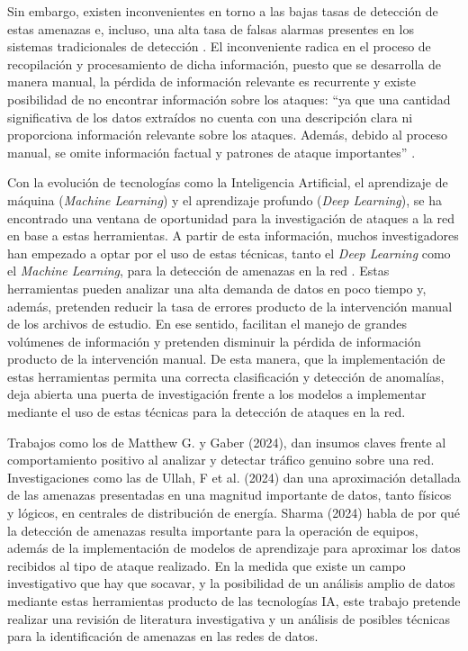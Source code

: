 \documentclass[12pt,a4paper]{article}
\begin{document}
Sin embargo, existen inconvenientes en torno a las bajas tasas de detección de estas amenazas e, incluso, una alta tasa de falsas alarmas presentes en los sistemas tradicionales de detección \cite[pág.~1]{alhawawreh2024explainable}. El inconveniente radica en el proceso de recopilación y procesamiento de dicha información, puesto que se desarrolla de manera manual, la pérdida de información relevante es recurrente y existe posibilidad de no encontrar información sobre los ataques: ``ya que una cantidad significativa de los datos extraídos no cuenta con una descripción clara ni proporciona información relevante sobre los ataques. Además, debido al proceso manual, se omite información factual y patrones de ataque importantes'' \cite[pág.~1]{alhawawreh2024explainable}.

Con la evolución de tecnologías como la Inteligencia Artificial, el aprendizaje de máquina (\textit{Machine Learning}) y el aprendizaje profundo (\textit{Deep Learning}), se ha encontrado una ventana de oportunidad para la investigación de ataques a la red en base a estas herramientas. A partir de esta información, muchos investigadores han empezado a optar por el uso de estas técnicas, tanto el \textit{Deep Learning} como el \textit{Machine Learning}, para la detección de amenazas en la red \cite[pág.~2]{sharma2024explainable}. Estas herramientas pueden analizar una alta demanda de datos en poco tiempo y, además, pretenden reducir la tasa de errores producto de la intervención manual de los archivos de estudio. En ese sentido, facilitan el manejo de grandes volúmenes de información y pretenden disminuir la pérdida de información producto de la intervención manual. De esta manera, que la implementación de estas herramientas permita una correcta clasificación y detección de anomalías, deja abierta una puerta de investigación frente a los modelos a implementar mediante el uso de estas técnicas para la detección de ataques en la red.

Trabajos como los de Matthew G. y Gaber (2024), dan insumos claves frente al comportamiento positivo al analizar y detectar tráfico genuino sobre una red. Investigaciones como las de Ullah, F et al. (2024) dan una aproximación detallada de las amenazas presentadas en una magnitud importante de datos, tanto físicos y lógicos, en centrales de distribución de energía. Sharma (2024) habla de por qué la detección de amenazas resulta importante para la operación de equipos, además de la implementación de modelos de aprendizaje para aproximar los datos recibidos al tipo de ataque realizado. En la medida que existe un campo investigativo que hay que socavar, y la posibilidad de un análisis amplio de datos mediante estas herramientas producto de las tecnologías IA, este trabajo pretende realizar una revisión de literatura investigativa y un análisis de posibles técnicas para la identificación de amenazas en las redes de datos.
\end{document}
